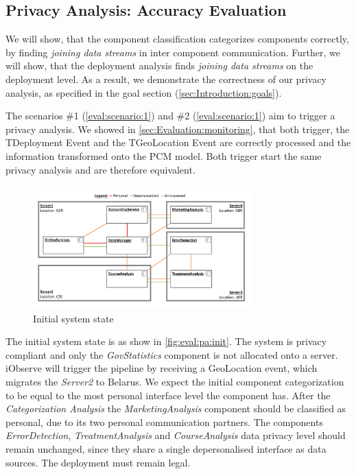 \subsection{Privacy Analysis: Accuracy Evaluation}

We will show, that the component classification categorizes components correctly, by finding \textit{joining data streams} in inter component communication. Further, we will show, that the deployment analysis finds \textit{joining data streams} on the deployment level. As a result, we demonstrate the correctness of our privacy analysis, as specified in the goal section (\autoref{sec:Introduction:goals}).

The scenarios \#1 (\autoref{eval:scenario:1}) and \#2 (\autoref{eval:scenario:1}) aim to trigger a privacy analysis. We showed in \autoref{sec:Evaluation:monitoring}, that both trigger, the TDeployment Event and the TGeoLocation Event are correctly processed and the information transformed onto the PCM model. Both trigger start the same privacy analysis and are therefore equivalent. 

\begin{figure}[h]
	\centering
	\includegraphics[trim = 0mm 10mm 0mm 10mm, clip, width=0.75\textwidth]{graphs/medSys_eval_pa_init}
	\caption{Initial system state}
	\label{fig:eval:pa:init}
\end{figure}

The initial system state is as show in \autoref{fig:eval:pa:init}. The system is privacy compliant and only the \textit{GovStatistics} component is not allocated onto a server. iObserve will trigger the pipeline by receiving a GeoLocation event, which migrates the \textit{Server2} to Belarus. We expect the initial component categorization to be equal to the most personal interface level the component has. After the \textit{Categorization Analysis} the \textit{MarketingAnalysis} component should be classified as personal, due to its two personal communication partners. The components \textit{ErrorDetection}, \textit{TreatmentAnalysis} and \textit{CourseAnalysis} data privacy level should remain unchanged, since they share a single depersonalised interface as data sources. The deployment must remain legal.

